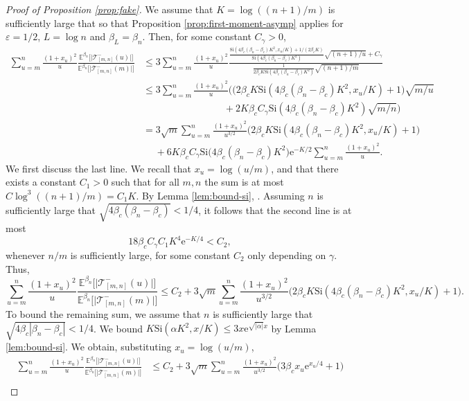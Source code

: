 \documentclass[a4paper, a4wide, 10pt, reqno]{amsart}
\theoremstyle{plain}
\theoremstyle{definition}
\numberwithin{equation}{section}
\newcommand{\E}{\mathbb E}
\newcommand{\sT}{{\mathscr T}}
\newcommand{\re}{{\mathrm e}}
\newcommand{\Si}{{\mathrm{Si}}}
\begin{document}
\begin{proof}[Proof of Proposition \ref{prop:fake}]
    We assume that $K=\log((n+1)/m)$ is sufficiently large that so that Proposition \ref{prop:first-moment-asymp} applies for $\varepsilon = 1/2$, $L=\log n$ and $\beta_L=\beta_n$. Then, for some constant $C_\gamma>0$,
    \begin{align*}
        \sum_{u=m}^n\frac{(1+x_u)^2}{u} \frac{\E^{\beta_n}\big[\big|\sT^-_{[m,n]}(u)\big|\big]}{\E^{\beta_n}\big[\big|\sT^-_{[m,n]}(m)\big|\big]}&\le 3\sum_{u=m}^n\frac{(1+x_u)^2}{u} \frac{\frac{\Si(4\beta_c(\beta_n-\beta_c)K^2, x_u/K)+1/(2\beta_cK)}{\Si(4\beta_c(\beta_n-\beta_c)K^2)}\sqrt{(n+1)/u}+C_\gamma}{\frac{1}{2\beta_cK\Si(4\beta_c(\beta_n-\beta_c)K^2)}\sqrt{(n+1)/m}}
        \\
        &\le 3\sum_{u=m}^n\frac{(1+x_u)^2}{u} \bigg(\big(2\beta_cK\Si(4\beta_c(\beta_n-\beta_c)K^2, x_u/K)+1\big)\sqrt{m/u} \\
        &\hspace{100pt}+2K\beta_cC_\gamma\Si(4\beta_c(\beta_n-\beta_c)K^2)\sqrt{m/n}\bigg) \\
        &=3\sqrt{m}\sum_{u=m}^n\frac{(1+x_u)^2}{u^{3/2}}\big(2\beta_cK\Si(4\beta_c(\beta_n-\beta_c)K^2, x_u/K)+1\big) \\
        &\hspace{15pt} + 6K\beta_cC_\gamma\Si\big(4\beta_c(\beta_n-\beta_c)K^2\big)\re^{-K/2}\sum_{u=m}^n\frac{(1+x_u)^2}{u}.
    \end{align*}
    We first discuss the last line. We recall that $x_u=\log(u/m)$, and that there exists a constant $C_1>0$ such that for all $m,n$ the sum is at most $C\log^3((n+1)/m)=C_1K$. By Lemma \ref{lem:bound-si}, \smash{$\Si(x)\le 3\re^{\sqrt{|x|}}$}. Assuming $n$ is sufficiently large that $\sqrt{4\beta_c(\beta_n-\beta_c)}<1/4$, it follows that the second line is at most 
    \[
    18\beta_c C_\gamma C_1 K^4 \re^{-K/4} < C_2,
    \]
    whenever $n/m$ is sufficiently large, for some constant $C_2$ only depending on $\gamma$.
    Thus, 
    \[
    \sum_{u=m}^n\frac{(1+x_u)^2}{u} \frac{\E^{\beta_n}\big[\big|\sT^-_{[m,n]}(u)\big|\big]}{\E^{\beta_n}\big[\big|\sT^-_{[m,n]}(m)\big|\big]}\le C_2 + 3\sqrt{m}\sum_{u=m}^n\frac{(1+x_u)^2}{u^{3/2}}\big(2\beta_cK\Si(4\beta_c(\beta_n-\beta_c)K^2, x_u/K)+1\big).
    \]
    To bound the remaining sum, we assume that $n$ is sufficiently large that  $\sqrt{4\beta_c|\beta_n-\beta_c|}<1/4$. We bound $K\Si(\alpha K^2, x/K)\le 3x\re^{\sqrt{|\alpha|}x}$ by Lemma \ref{lem:bound-si}. 
    We obtain, substituting $x_u=\log(u/m)$,
    \[
    \begin{aligned}
    \sum_{u=m}^n\frac{(1+x_u)^2}{u} \frac{\E^{\beta_n}\big[\big|\sT^-_{[m,n]}(u)\big|\big]}{\E^{\beta_n}\big[\big|\sT^-_{[m,n]}(m)\big|\big]}&\le C_2 + 3\sqrt{m}\sum_{u=m}^n\frac{(1+x_u)^2}{u^{3/2}}\Big(3\beta_cx_u\re^{x_u/4}+1\Big) \\

\end{aligned}\]
\end{proof}
\end{document}
